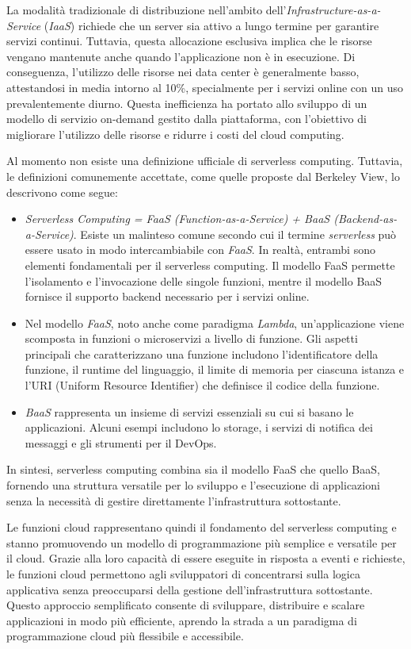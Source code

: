 La modalità tradizionale di distribuzione nell’ambito dell’\textit{Infrastructure-as-a-Service} (\textit{IaaS}) richiede che un server sia attivo a lungo termine per garantire servizi continui. Tuttavia, questa allocazione esclusiva implica che le risorse vengano mantenute anche quando l’applicazione non è in esecuzione. Di conseguenza, l'utilizzo delle risorse nei data center è generalmente basso, attestandosi in media intorno al 10\%, specialmente per i servizi online con un uso prevalentemente diurno. Questa inefficienza ha portato allo sviluppo di un modello di servizio on-demand gestito dalla piattaforma, con l’obiettivo di migliorare l’utilizzo delle risorse e ridurre i costi del cloud computing.

Al momento non esiste una definizione ufficiale di serverless computing. Tuttavia, le definizioni comunemente accettate, come quelle proposte dal Berkeley View, lo descrivono come segue:
\begin{itemize}
    \item \textit{Serverless Computing = FaaS (Function-as-a-Service) + BaaS (Backend-as-a-Service)}. Esiste un malinteso comune secondo cui il termine \textit{serverless} può essere usato in modo intercambiabile con \textit{FaaS}. In realtà, entrambi sono elementi fondamentali per il serverless computing. Il modello FaaS permette l'isolamento e l'invocazione delle singole funzioni, mentre il modello BaaS fornisce il supporto backend necessario per i servizi online.
    \item Nel modello \textit{FaaS}, noto anche come paradigma \textit{Lambda}, un’applicazione viene scomposta in funzioni o microservizi a livello di funzione. Gli aspetti principali che caratterizzano una funzione includono l'identificatore della funzione, il runtime del linguaggio, il limite di memoria per ciascuna istanza e l'URI (Uniform Resource Identifier) che definisce il codice della funzione.
    \item \textit{BaaS} rappresenta un insieme di servizi essenziali su cui si basano le applicazioni. Alcuni esempi includono lo storage, i servizi di notifica dei messaggi e gli strumenti per il DevOps.
\end{itemize}
In sintesi, serverless computing combina sia il modello FaaS che quello BaaS, fornendo una struttura versatile per lo sviluppo e l'esecuzione di applicazioni senza la necessità di gestire direttamente l'infrastruttura sottostante.

Le funzioni cloud rappresentano quindi il fondamento del serverless computing e stanno promuovendo un modello di programmazione più semplice e versatile per il cloud. Grazie alla loro capacità di essere eseguite in risposta a eventi e richieste, le funzioni cloud permettono agli sviluppatori di concentrarsi sulla logica applicativa senza preoccuparsi della gestione dell'infrastruttura sottostante. Questo approccio semplificato consente di sviluppare, distribuire e scalare applicazioni in modo più efficiente, aprendo la strada a un paradigma di programmazione cloud più flessibile e accessibile.

